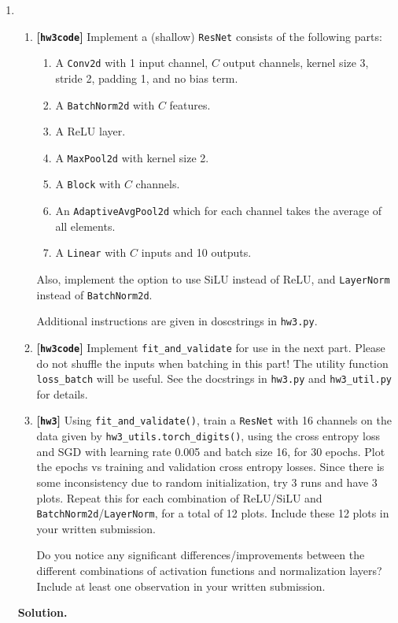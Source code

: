 \documentclass{article}
\def\hw{\textbf{[\texttt{hw3}]}\xspace}
\def\hwcode{\textbf{[\texttt{hw3code}]}\xspace}
\theoremstyle{definition}
\theoremstyle{remark}
\newenvironment{Q}
{%
\clearpage
\item
}
{%
\phantom{s}%
\bigskip%
\noindent\textbf{Solution.}
}
\begin{document}
\begin{enumerate}[font={\Large\bfseries},leftmargin=0pt]
\begin{Q}
\begin{enumerate}
        \item \hwcode Implement a (shallow) \texttt{ResNet} consists of the following parts:
        \begin{enumerate}
            \item A \texttt{Conv2d} with 1 input channel, $C$ output channels, kernel size 3, stride 2, padding 1, and no bias term.
            \item A \texttt{BatchNorm2d} with $C$ features.
            \item A ReLU layer.
            \item A \texttt{MaxPool2d} with kernel size 2.
            \item A \texttt{Block} with $C$ channels.
            \item An \texttt{AdaptiveAvgPool2d} which for each channel takes the average of all elements.
            \item A \texttt{Linear} with $C$ inputs and 10 outputs.
        \end{enumerate}
        Also, implement the option to use SiLU instead of ReLU, and \texttt{LayerNorm} instead of \texttt{BatchNorm2d}.

        Additional instructions are given in doscstrings in \texttt{hw3.py}.

        \item \hwcode Implement \texttt{fit\_and\_validate} for use in
            the next part.  Please do not shuffle the
            inputs when batching in this part!  The utility
            function \texttt{loss\_batch} will be useful. See
            the docstrings in \texttt{hw3.py} and \texttt{hw3\_util.py} for details.

        \item \hw Using \texttt{fit\_and\_validate()}, train a \texttt{ResNet} with 16 channels on the data given by \texttt{hw3\_utils.torch\_digits()}, using the cross entropy loss and SGD with learning rate 0.005 and batch size 16, for 30 epochs. Plot the epochs vs training and validation cross entropy losses. Since there is some inconsistency due to random initialization, try 3 runs and have 3 plots.
           Repeat this for each combination of ReLU/SiLU and \texttt{BatchNorm2d}/\texttt{LayerNorm}, for a total of 12 plots. Include these 12 plots in your written submission.

           Do you notice any significant differences/improvements between the different combinations of activation functions and normalization layers? Include at least one observation in your written submission.
    \end{enumerate}
\end{Q}
    

\end{enumerate}
\end{document}
